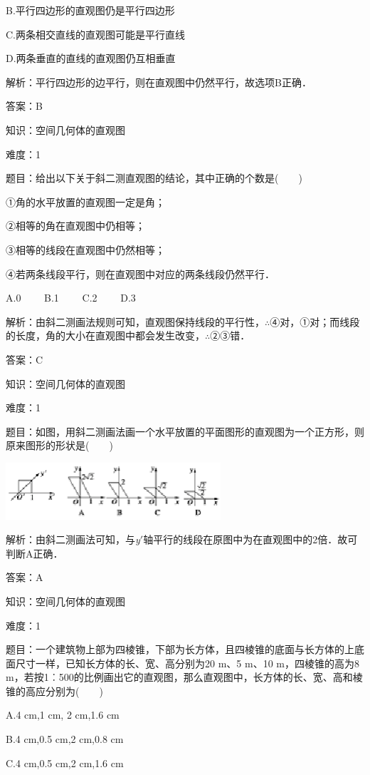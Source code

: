 \documentclass{article} %
\begin{document}
B.平行四边形的直观图仍是平行四边形

C.两条相交直线的直观图可能是平行直线

D.两条垂直的直线的直观图仍互相垂直

解析：平行四边形的边平行，则在直观图中仍然平行，故选项B正确．

答案：B

知识：空间几何体的直观图

难度：1

题目：给出以下关于斜二测直观图的结论，其中正确的个数是(　　)

①角的水平放置的直观图一定是角；

②相等的角在直观图中仍相等；

③相等的线段在直观图中仍然相等；

④若两条线段平行，则在直观图中对应的两条线段仍然平行．

A.0　　 B.1　　 C.2　　 D.3

解析：由斜二测画法规则可知，直观图保持线段的平行性，$\mathrm{\therefore}$④对，①对；而线段的长度，角的大小在直观图中都会发生改变，$\mathrm{\therefore}$②③错．

答案：C

知识：空间几何体的直观图

难度：1

题目：如图，用斜二测画法画一个水平放置的平面图形的直观图为一个正方形，则原来图形的形状是(　　)

\includegraphics*[width=3.15in, height=0.83in, keepaspectratio=false]{image47}

解析：由斜二测画法可知，与\textit{y}$'$轴平行的线段在原图中为在直观图中的2倍．故可判断A正确．

答案：A

知识：空间几何体的直观图

难度：1

题目：一个建筑物上部为四棱锥，下部为长方体，且四棱锥的底面与长方体的上底面尺寸一样，已知长方体的长、宽、高分别为20 m、5 m、10 m，四棱锥的高为8 m，若按1︰500的比例画出它的直观图，那么直观图中，长方体的长、宽、高和棱锥的高应分别为(　　)

A.4 cm,1 cm, 2 cm,1.6 cm

B.4 cm,0.5 cm,2 cm,0.8 cm

C.4 cm,0.5 cm,2 cm,1.6 cm
\end{document}
